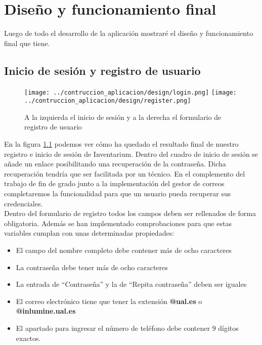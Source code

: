 \chapter{Diseño y funcionamiento final}
Luego de todo el desarrollo de la aplicación mostraré el diseño y funcionamiento final que tiene.

\section{Inicio de sesión y registro de usuario}
\begin{figure}[h]
    \centering
    \texttt{[image: ../contruccion\_aplicacion/design/login.png]}
    \texttt{[image: ../contruccion\_aplicacion/design/register.png]}
    \caption{A la izquierda el inicio de sesión y a la derecha el formulario de registro de usuario}\label{fig:register-and-login}
\end{figure}
En la figura \ref{fig:register-and-login} podemos ver cómo ha quedado el resultado final de nuestro registro e inicio de sesión de Inventarium. Dentro del cuadro de inicio de sesión se añade un enlace posibilitando una recuperación de la contraseña. Dicha recuperación tendría que ser facilitada por un técnico. En el complemento del trabajo de fin de grado junto a la implementación del gestor de correos completaremos la funcionalidad para que un usuario pueda recuperar sus credenciales.
\\Dentro del formulario de registro todos los campos deben ser rellenados de forma obligatoria. Además se han implementado comprobaciones para que estas variables cumplan con unas determinadas propiedades:
\begin{itemize}
    \item El campo del nombre completo debe contener más de ocho caracteres
    \item La contraseña debe tener más de ocho caracteres
    \item La entrada de ``Contraseña'' y la de ``Repita contraseña'' deben ser iguales
    \item El correo electrónico tiene que tener la extensión \textbf{@ual.es} o \textbf{@inlumine.ual.es}
    \item El apartado para ingresar el número de teléfono debe contener 9 dígitos exactos.
\end{itemize}

